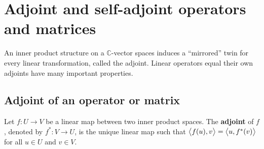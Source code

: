 \chapter{Adjoint and self-adjoint operators and matrices}
An inner product structure on a \(\mathbb{C}\)-vector spaces induces a
``mirrored'' twin for every linear transformation, called the adjoint.
Linear operators equal their own adjoints have many important properties.

\section{Adjoint of an operator or matrix}
\begin{definition}
  Let \(f : U \to V\) be a linear map between two inner product spaces.
  The \textbf{adjoint} of \(f\), denoted by \(f^* : V \to U\), is the unique linear map
  such that
  \(\left\langle f(u), v\right\rangle = \left\langle u, f^*(v)\right\rangle\)
  for all \(u \in U\) and \(v \in V\).
\end{definition}

